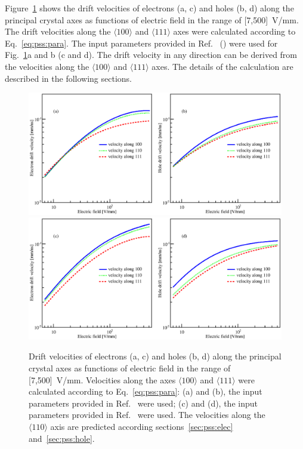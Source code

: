 Figure~\ref{fig:pss:vvse} shows the drift velocities of electrons (a, c) and holes (b, d) along the principal crystal axes as functions of electric field in the range of [7,500]~V/mm. The drift velocities along the $\langle 100 \rangle$ and $\langle 111 \rangle$ axes were calculated according to Eq.~\ref{eq:pss:para}. The input parameters provided in Ref.~\cite{miha} (\cite{bart}) were used for Fig.~\ref{fig:pss:vvse}a and b (c and d). 
The drift velocity in any direction 
can be derived from the velocities along  the 
$\langle 100 \rangle$ and $\langle 111 \rangle$ axes.
The details of the calculation are described in the following sections. 
 
\begin{figure}[tbhp] 
\centering 
\includegraphics[width=\textwidth]{VvsElucian} \\\hfil 
\includegraphics[width=\textwidth]{VvsEbart} 
\caption{Drift velocities of electrons (a, c) and holes (b, d) along
the principal crystal axes as functions of electric field in the range
of [7,500]~V/mm. Velocities along the axes $\langle 100 \rangle$ and
$\langle 111 \rangle$ were calculated according to
Eq.~\ref{eq:pss:para}: (a) and (b), the input parameters provided in
Ref.~\cite{miha} were used; (c) and (d), the input parameters provided
in Ref.~\cite{bart} were used. The velocities along the $\langle 110
\rangle$ axis are predicted according sections~\ref{sec:pss:elec}
and~\ref{sec:pss:hole}.}
\label{fig:pss:vvse} 
\end{figure} 
 
